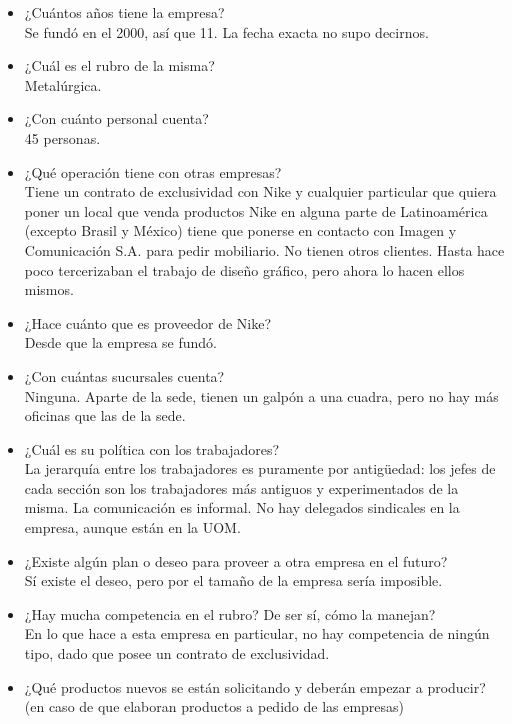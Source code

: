 \documentclass[a4paper,10pt,titlepage]{article}
\begin{document}
\begin{itemize}

\item ¿Cu\'antos a\~nos tiene la empresa? \\
Se fund\'o en el 2000, as\'i que 11. La fecha exacta no supo decirnos.
\item ¿Cu\'al es el rubro de la misma? \\
Metal\'urgica.
\item ¿Con cu\'anto personal cuenta? \\
45 personas.
\item ¿Qu\'e operaci\'on tiene con otras empresas? \\
Tiene un contrato de exclusividad con Nike y cualquier particular que quiera poner un local que venda productos Nike 
en alguna parte de Latinoam\'erica (excepto Brasil y M\'exico) tiene que ponerse en contacto con Imagen y Comunicaci\'on S.A. 
para pedir mobiliario. No tienen otros clientes. Hasta hace poco tercerizaban el trabajo de diseño gr\'afico, pero ahora lo hacen ellos mismos.
\item ¿Hace cu\'anto que es proveedor de Nike? \\
Desde que la empresa se fund\'o.
\item ¿Con cu\'antas sucursales cuenta? \\
Ninguna. Aparte de la sede, tienen un galp\'on a una cuadra, pero no hay m\'as oficinas que las de la sede.
\item ¿Cu\'al es su pol\'itica con los trabajadores? \\
La jerarqu\'ia entre los trabajadores es puramente por antig\"uedad: los jefes de cada secci\'on son los trabajadores m\'as antiguos
 y experimentados de la misma. La comunicaci\'on es informal. No hay delegados sindicales en la empresa, aunque est\'an en la UOM.
\item ¿Existe alg\'un plan o deseo para proveer a otra empresa en el futuro? \\
S\'i existe el deseo, pero por el tamaño de la empresa ser\'ia imposible.
\item ¿Hay mucha competencia en el rubro? De ser s\'i, c\'omo la manejan? \\
En lo que hace a esta empresa en particular, no hay competencia de ning\'un tipo, dado que posee un contrato de exclusividad.
\item ¿Qu\'e productos nuevos se est\'an solicitando y deber\'an empezar a producir? (en caso de que elaboran productos a pedido de las empresas) \\

\end{itemize}
\end{document}
